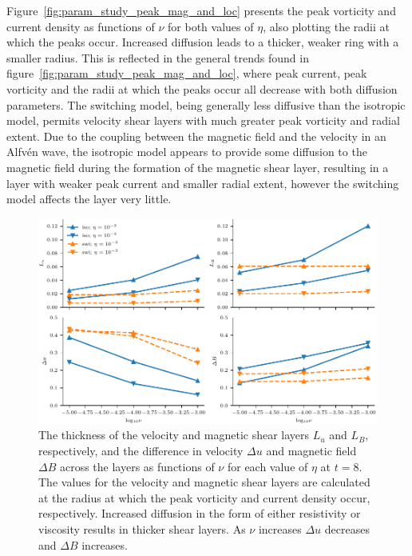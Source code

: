 Figure~\ref{fig:param_study_peak_mag_and_loc} presents the peak vorticity and current density as functions of $\nu$ for both values of $\eta$, also plotting the radii at which the peaks occur. Increased diffusion leads to a thicker, weaker ring with a smaller radius. This is reflected in the general trends found in figure~\ref{fig:param_study_peak_mag_and_loc}, where peak current, peak vorticity and the radii at which the peaks occur all decrease with both diffusion parameters. The switching model, being generally less diffusive than the isotropic model, permits velocity shear layers with much greater peak vorticity and radial extent. Due to the coupling between the magnetic field and the velocity in an Alfv\'en wave, the isotropic model appears to provide some diffusion to the magnetic field during the formation of the magnetic shear layer, resulting in a layer with weaker peak current and smaller radial extent, however the switching model affects the layer very little.

\begin{figure}[t]
  \centering
  \includegraphics[width=1.0\linewidth]{param_study/layer_thickness_and_shear.pdf}
  \caption{The thickness of the velocity and magnetic shear layers $L_u$ and $L_B$, respectively, and the difference in velocity $\Delta u$ and magnetic field $\Delta B$ across the layers as functions of $\nu$ for each value of $\eta$ at $t=8$. The values for the velocity and magnetic shear layers are calculated at the radius at which the peak vorticity and current density occur, respectively. Increased diffusion in the form of either resistivity or viscosity results in thicker shear layers. As $\nu$ increases $\Delta u$ decreases and $\Delta B$ increases.}%
  \label{fig:layer_thickness_and_shear}
\end{figure}

